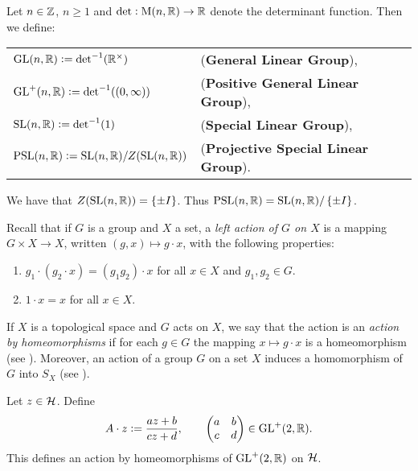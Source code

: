 \begin{definition}
	Let $n \in \mathbb{Z}$, $n \geq 1$ and $\mathrm{det} : \mathrm{M}(n,\mathbb{R}) \to \mathbb{R}$ denote the determinant function. Then we define:
	\begin{center}
		\begin{tabular}{ll}
			$\mathrm{GL}(n,\mathbb{R}) := \mathrm{det}^{-1}(\mathbb{R}^\times)$ & (\textbf{General Linear Group}),\\
			$\GLrm^+(n,\Rbb) := \det^{-1}(\intoo{0,\infty})$ & (\textbf{Positive General Linear Group}),\\
			$\mathrm{SL}(n,\mathbb{R}) := \mathrm{det}^{-1}(1)$ & (\textbf{Special Linear Group}),\\
			$\mathrm{PSL}(n,\mathbb{R}) := \mathrm{SL}(n,\mathbb{R})/ Z(\mathrm{SL}(n,\mathbb{R}))$ & (\textbf{Projective Special Linear Group}).\\
		\end{tabular}
	\end{center}
\end{definition}

\begin{remark}
	We have that $Z(\SLrm(n,\Rbb)) = \cbr[0]{\pm I}$. Thus $\PSLrm(n,\Rbb) = \SLrm(n,\Rbb)/\cbr[0]{\pm I}$.
\end{remark}

Recall that if $G$ is a group and $X$ a set, a \emph{left action of $G$ on $X$} is a mapping $G \times X \to X$, written $(g,x) \mapsto g \cdot x$, with the following properties:
\begin{enumerate}[label = \textup{(}\roman*\textup{)}]
	\item $g_1 \cdot (g_2 \cdot x) = (g_1g_2) \cdot x$ for all $x \in X$ and $g_1,g_2 \in G$.
	\item $1 \cdot x = x$ for all $x \in X$.
\end{enumerate}
If $X$ is a topological space and $G$ acts on $X$, we say that the action is an \emph{action by homeomorphisms} if for each $g \in G$ the mapping $x \mapsto g \cdot x$ is a homeomorphism (see \cite[78--79]{lee:topological_manifolds:2011}). Moreover, an action of a group $G$ on a set $X$ induces a homomorphism of $G$ into $S_X$ (see \cite[54]{grillet:abstract_algebra:2007}).

\begin{proposition}
	Let $z \in \mathcal{H}$. Define 
	\begin{equation}
		A \cdot z := \frac{az + b}{cz + d}, \qquad \begin{pmatrix}
			a & b\\
			c & d
		\end{pmatrix} \in \mathrm{GL}^+(2,\mathbb{R}).
	\end{equation}
	This defines an action by homeomorphisms of $\mathrm{GL}^+(2,\mathbb{R})$ on $\mathcal{H}$.
	\label{prop:action}
\end{proposition}

